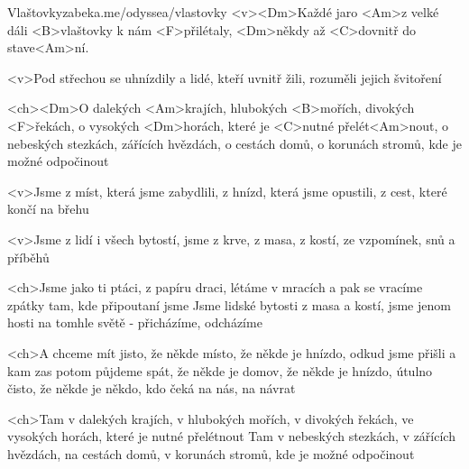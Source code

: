 \begin{song}[Traband]{19}{Vlaštovky}{zabeka.me/odyssea/vlastovky}
	<v><Dm>Každé jaro <Am>z velké dáli
	<B>vlaštovky k nám <F>přilétaly,
	<Dm>někdy až <C>dovnitř do stave<Am>ní.

	<v>Pod střechou se uhnízdily
	a lidé, kteří uvnitř žili,
	rozuměli jejich švitoření

	<ch><Dm>O dalekých <Am>krajích, hlubokých <B>mořích, divokých <F>řekách,
	o vysokých <Dm>horách, které je <C>nutné přelét<Am>nout,
	o nebeských stezkách, zářících hvězdách, o cestách domů,
	o korunách stromů, kde je možné odpočinout

	<v>Jsme z míst, která jsme zabydlili,
	z hnízd, která jsme opustili,
	z cest, které končí na břehu

	<v>Jsme z lidí i všech bytostí,
	jsme z krve, z masa, z kostí,
	ze vzpomínek, snů a příběhů

	<ch>Jsme jako ti ptáci, z papíru draci, létáme v mracích
	a pak se vracíme zpátky tam, kde připoutaní jsme
	Jsme lidské bytosti z masa a kostí, jsme jenom hosti
	na tomhle světě - přicházíme, odcházíme

	<ch>A chceme mít jisto, že někde místo, že někde je hnízdo,
	odkud jsme přišli a kam zas potom půjdeme spát,
	že někde je domov, že někde je hnízdo, útulno čisto,
	že někde je někdo, kdo čeká na nás, na návrat

	<ch>Tam v dalekých krajích, v hlubokých mořích, v divokých řekách,
	ve vysokých horách, které je nutné přelétnout
	Tam v nebeských stezkách, v zářících hvězdách, na cestách domů,
	v korunách stromů, kde je možné odpočinout

\end{song}
